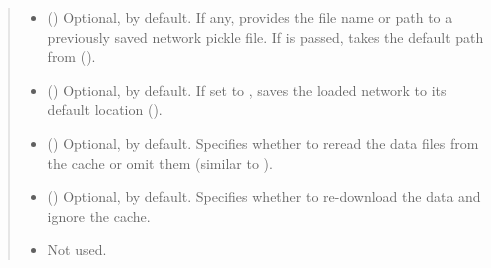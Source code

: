 \documentclass[letterpaper,10pt,english]{sphinxmanual}
\begin{document}
\begin{fulllineitems}
\begin{fulllineitems}
\begin{quote}
\begin{description}
\begin{itemize}
\item {} 
 () \textendash{} Optional,  by default. If any, provides the file
name or path to a previously saved network pickle file.
If  is passed, takes the default path from
{\hyperref[\detokenize{main:pypath.main.PyPath.save_network}]{}}
().

\item {} 
 () \textendash{} Optional,  by default. If set to , saves
the loaded network to its default location
().

\item {} 
 () \textendash{} Optional,  by default. Specifies whether to reread
the data files from the cache or omit them (similar to
).

\item {} 
 () \textendash{} Optional,  by default. Specifies whether to
re-download the data and ignore the cache.

\item {} 
 \textendash{} Not used.

\end{itemize}

\end{description}\end{quote}

\end{fulllineitems}



\end{fulllineitems}
\end{document}
